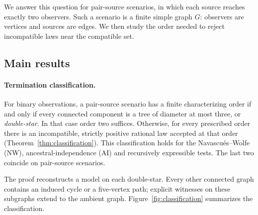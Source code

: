\documentclass[11pt]{article}
\theoremstyle{plain}
\theoremstyle{definition}
\begin{document}
We answer this question for pair-source scenarios, in which each source reaches exactly two observers. Such a scenario is a finite simple graph $G$: observers are vertices and sources are edges. We then study the order needed to reject incompatible laws near the compatible set.

\subsection{Main results}

\paragraph{Termination classification.}
For binary observations, a pair-source scenario has a finite characterizing order if and only if every connected component is a tree of diameter at most three, or \emph{double-star}. In that case order two suffices. Otherwise, for every prescribed order there is an incompatible, strictly positive rational law accepted at that order (Theorem~\ref{thm:classification}). This classification holds for the Navascués--Wolfe (NW), ancestral-independence (AI) and recursively expressible tests. The last two coincide on pair-source scenarios.

The proof reconstructs a model on each double-star. Every other connected graph contains an induced cycle or a five-vertex path; explicit witnesses on these subgraphs extend to the ambient graph. Figure~\ref{fig:classification} summarizes the classification.
\end{document}
